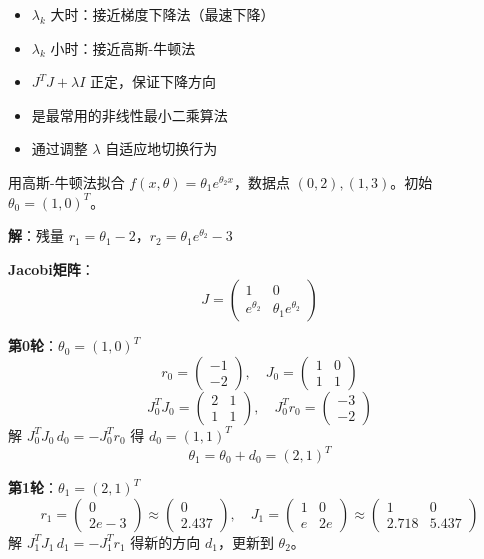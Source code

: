 \begin{notebox}[LM方法的特点]
\begin{itemize}[itemsep=0.3em]
    \item $\lambda_k$ 大时：接近梯度下降法（最速下降）
    \item $\lambda_k$ 小时：接近高斯-牛顿法
    \item $J^T J + \lambda I$ 正定，保证下降方向
    \item 是最常用的非线性最小二乘算法
    \item 通过调整 $\lambda$ 自适应地切换行为
\end{itemize}
\end{notebox}

\begin{example}[高斯-牛顿法迭代两次]\label{ex:gn}
用高斯-牛顿法拟合 $f(x, \theta) = \theta_1 e^{\theta_2 x}$，数据点 $(0, 2), (1, 3)$。初始 $\theta_0 = (1, 0)^T$。

\textbf{解}：残量 $r_1 = \theta_1 - 2$，$r_2 = \theta_1 e^{\theta_2} - 3$

\textbf{Jacobi矩阵}：
\[
J = \begin{pmatrix} 1 & 0 \\ e^{\theta_2} & \theta_1 e^{\theta_2} \end{pmatrix}
\]

\textbf{第0轮}：$\theta_0 = (1, 0)^T$
\[
r_0 = \begin{pmatrix} -1 \\ -2 \end{pmatrix},\quad
J_0 = \begin{pmatrix} 1 & 0 \\ 1 & 1 \end{pmatrix}
\]
\[
J_0^T J_0 = \begin{pmatrix} 2 & 1 \\ 1 & 1 \end{pmatrix},\quad
J_0^T r_0 = \begin{pmatrix} -3 \\ -2 \end{pmatrix}
\]
解 $J_0^T J_0 \, d_0 = -J_0^T r_0$ 得 $d_0 = (1, 1)^T$
\[
\theta_1 = \theta_0 + d_0 = (2, 1)^T
\]

\textbf{第1轮}：$\theta_1 = (2, 1)^T$
\[
r_1 = \begin{pmatrix} 0 \\ 2e - 3 \end{pmatrix} \approx \begin{pmatrix} 0 \\ 2.437 \end{pmatrix},\quad
J_1 = \begin{pmatrix} 1 & 0 \\ e & 2e \end{pmatrix} \approx \begin{pmatrix} 1 & 0 \\ 2.718 & 5.437 \end{pmatrix}
\]
解 $J_1^T J_1 \, d_1 = -J_1^T r_1$ 得新的方向 $d_1$，更新到 $\theta_2$。
\end{example}


